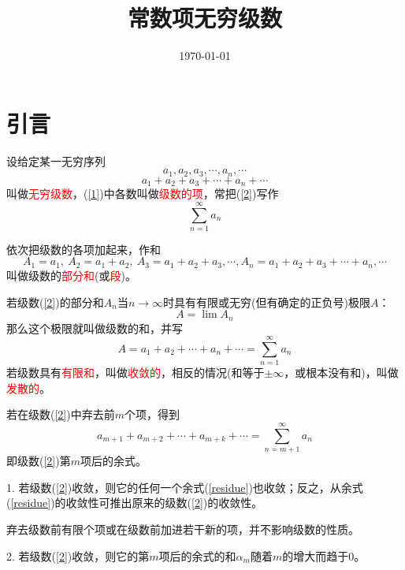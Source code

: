 \documentclass[12pt,a4paper]{article}
\title{常数项无穷级数}
\author{}
\date{\today}
\begin{document}
\maketitle

\section{引言}
设给定某一无穷序列
\begin{equation}
a_1, a_2, a_3, \cdots, a_n, \cdots
\label{1}
\end{equation}
\begin{equation}
a_1 + a_2+ a_3+ \cdots+ a_n+ \cdots
\label{2}
\end{equation}
叫做\textcolor{red}{无穷级数}，(\ref{1})中各数叫做\textcolor{red}{级数的项}，常把(\ref{2})写作
\begin{equation}
\sum\limits_{n=1}^{\infty} a_n
\end{equation}

依次把级数的各项加起来，作和
\begin{equation}
A_1 = a_1, ~A_2 = a_1 +a_2, ~A_3 = a_1 +a_2 +a_3, \cdots, A_n = a_1 +a_2 +a_3+\cdots +a_n, \cdots
\end{equation}
叫做级数的\textcolor{red}{部分和}(或\textcolor{red}{段})。

若级数(\ref{2})的部分和$A_n$当$n\rightarrow \infty$时具有有限或无穷(但有确定的正负号)极限$A$：
\begin{equation}
A = \lim A_n
\end{equation}
那么这个极限就叫做级数的和，并写
\begin{equation*}
A = a_1 +a_2 +\cdots +a_n +\cdots = \sum\limits_{n=1}^{\infty} a_n
\end{equation*}
若级数具有\textcolor{red}{有限和}，叫做\textcolor{red}{收敛的}，相反的情况(和等于$\pm \infty$，或根本没有和)，叫做\textcolor{red}{发散的}。


若在级数(\ref{2})中弃去前$m$个项，得到
\begin{equation*}
a_{m+1} +a_{m+2} +\cdots +a_{m+k} +\cdots = \sum\limits_{n=m+1}^{\infty} a_n
\label{residue}
\end{equation*}
即级数(\ref{2})第$m$项后的余式。

1. 若级数(\ref{2})收敛，则它的任何一个余式(\ref{residue})也收敛；反之，从余式(\ref{residue})的收敛性可推出原来的级数(\ref{2})的收敛性。

弃去级数前有限个项或在级数前加进若干新的项，并不影响级数的性质。

2. 若级数(\ref{2})收敛，则它的第$m$项后的余式的和$\alpha_m$随着$m$的增大而趋于$0$。
\end{document}
